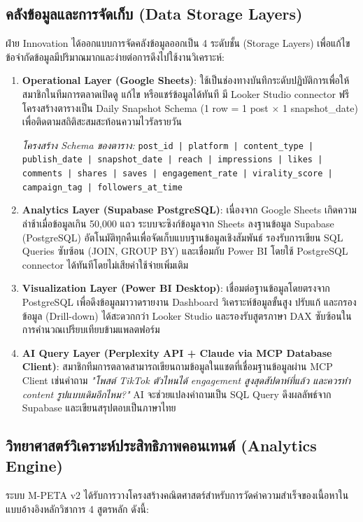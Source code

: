 \documentclass[10pt,a4paper]{article}
\begin{document}
\subsection{คลังข้อมูลและการจัดเก็บ (Data Storage Layers)}
ฝ่าย Innovation ได้ออกแบบการจัดคลังข้อมูลออกเป็น 4 ระดับชั้น (Storage Layers) เพื่อแก้ไขข้อจำกัดข้อมูลมีปริมาณมากและง่ายต่อการดึงไปใช้งานวิเคราะห์:
\begin{enumerate}[label=\bfseries ชั้นที่ \arabic*:]
  \item \textbf{Operational Layer (Google Sheets)}: ใช้เป็นช่องทางบันทึกระดับปฏิบัติการเพื่อให้สมาชิกในทีมการตลาดเปิดดู แก้ไข หรือแชร์ข้อมูลได้ทันที มี Looker Studio connector ฟรี โครงสร้างตารางเป็น Daily Snapshot Schema (1 row = 1 post $\times$ 1 snapshot\_date) เพื่อติดตามสถิติสะสมสะท้อนความไวรัลรายวัน
  
  \textit{โครงสร้าง Schema ของตาราง:} \texttt{post\_id | platform | content\_type | publish\_date | snapshot\_date | reach | impressions | likes | comments | shares | saves | engagement\_rate | virality\_score | campaign\_tag | followers\_at\_time}
  
  \item \textbf{Analytics Layer (Supabase PostgreSQL)}: เนื่องจาก Google Sheets เกิดความล่าช้าเมื่อข้อมูลเกิน 50,000 แถว ระบบจะซิงก์ข้อมูลจาก Sheets ลงฐานข้อมูล Supabase (PostgreSQL) อัตโนมัติทุกคืนเพื่อจัดเก็บแบบฐานข้อมูลเชิงสัมพันธ์ รองรับการเขียน SQL Queries ซับซ้อน (JOIN, GROUP BY) และเชื่อมกับ Power BI โดยใช้ PostgreSQL connector ได้ทันทีโดยไม่เสียค่าใช้จ่ายเพิ่มเติม
  \item \textbf{Visualization Layer (Power BI Desktop)}: เชื่อมต่อฐานข้อมูลโดยตรงจาก PostgreSQL เพื่อดึงข้อมูลมาวาดรายงาน Dashboard วิเคราะห์ข้อมูลขั้นสูง ปรับแก้ และกรองข้อมูล (Drill-down) ได้สะดวกกว่า Looker Studio และรองรับสูตรภาษา DAX ซับซ้อนในการคำนวณเปรียบเทียบข้ามแพลตฟอร์ม
  \item \textbf{AI Query Layer (Perplexity API + Claude via MCP Database Client)}: สมาชิกทีมการตลาดสามารถเขียนถามข้อมูลในแชตที่เชื่อมฐานข้อมูลผ่าน MCP Client เช่นคำถาม \textit{"โพสต์ TikTok ตัวไหนได้ engagement สูงสุดสัปดาห์ที่แล้ว และควรทำ content รูปแบบเดิมอีกไหม?"} AI จะช่วยแปลงคำถามเป็น SQL Query ดึงผลลัพธ์จาก Supabase และเขียนสรุปตอบเป็นภาษาไทย
\end{enumerate}

\subsection{วิทยาศาสตร์วิเคราะห์ประสิทธิภาพคอนเทนต์ (Analytics Engine)}
ระบบ M-PETA v2 ได้รับการวางโครงสร้างคณิตศาสตร์สำหรับการวัดค่าความสำเร็จของเนื้อหาในแบบอ้างอิงหลักวิชาการ 4 สูตรหลัก ดังนี้:
\end{document}
